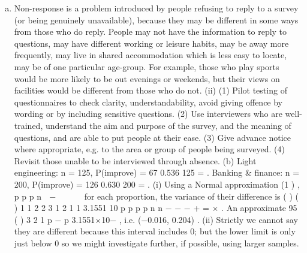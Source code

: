 \documentclass[a4paper,12pt]{article}
\begin{document}
\begin{enumerate}[(a)]
\item  Non-response is a problem introduced by people refusing to reply to a
survey (or being genuinely unavailable), because they may be different in
some ways from those who do reply. People may not have the information to
reply to questions, may have different working or leisure habits, may be away
more frequently, may live in shared accommodation which is less easy to
locate, may be of one particular age-group.
For example, those who play sports would be more likely to be out evenings
or weekends, but their views on facilities would be different from those who
do not.
(ii) (1) Pilot testing of questionnaires to check clarity,
understandability, avoid giving offence by wording or by
including sensitive questions.
(2) Use interviewers who are well-trained, understand the aim and
purpose of the survey, and the meaning of questions, and are
able to put people at their ease.
(3) Give advance notice where appropriate, e.g. to the area or
group of people being surveyed.
(4) Revisit those unable to be interviewed through absence.
(b) Light engineering: n = 125, P(improve) = 67 0.536
125
= .
Banking & finance: n = 200, P(improve) = 126 0.630
200
= .
(i) Using a Normal approximation (1 )
,
p p
p
n
 − 
 
 
for each proportion, the
variance of their difference is ( ) ( ) 1 1 2 2 3
1 2
1 1
3.1551 10
p p p p
n n
− − −
+ = × .
An approximate 95%
( ) 3
2 1 p − p  3.1551×10− , i.e. (−0.016, 0.204) .
(ii) Strictly we cannot say they are different because this interval
includes 0; but the lower limit is only just below 0 so we might investigate
further, if possible, using larger samples.
\end{enumerate}
\end{document}
